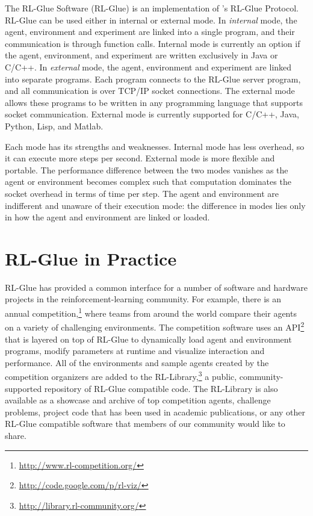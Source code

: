 \documentclass[twoside,11pt]{article}
\begin{document}
The RL-Glue Software (RL-Glue) is an implementation of \citeauthor{whiteThesis}'s RL-Glue Protocol.  RL-Glue can be used either in  internal or external mode.  In \textit{internal} mode, the agent, environment and experiment are linked into a single program, and their communication is through function calls.  Internal mode is currently an option if the agent, environment, and experiment are written exclusively in Java or C/C++.  In  \textit{external} mode, the agent, environment and experiment are linked into separate programs.  Each program connects to the RL-Glue server program, and all communication is over TCP/IP socket connections. The external mode allows these programs to be written in any programming language that supports socket communication.  External mode is currently supported for C/C++, Java, Python, Lisp, and Matlab.

Each mode has its strengths and weaknesses. Internal mode has less overhead, so it can execute more steps per second. External mode is more flexible and portable.  The performance difference between the two modes vanishes as the agent or environment becomes complex such that computation dominates the socket overhead in terms of time per step.  The agent and environment are indifferent and unaware of their execution mode: the difference in modes lies only in how the agent and environment are linked or loaded.

\section{RL-Glue in Practice}
RL-Glue has provided a common interface for a number of software and hardware projects in the reinforcement-learning community.  For example, there is an annual competition,\footnote{\url{http://www.rl-competition.org/}} where teams from around the world compare their agents on a variety of challenging environments.  The competition software uses an API\footnote{\url{http://code.google.com/p/rl-viz/}} that is layered on top of RL-Glue to dynamically load agent and environment programs, modify parameters at runtime and visualize interaction and performance.  All of the environments and sample agents created by the competition organizers are added to the RL-Library,\footnote{\url{http://library.rl-community.org/}} a public, community-supported repository of RL-Glue compatible code. The RL-Library is also available as a showcase and archive of top competition agents, challenge problems, project code that has been used in academic publications, or any other RL-Glue compatible software that members of our community would like to share.
\end{document}
